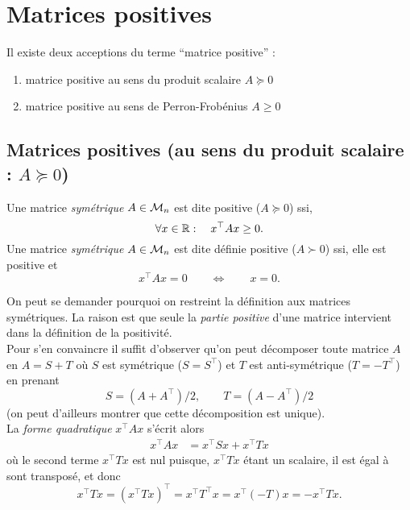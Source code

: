 \section{Matrices positives} \label{sec:LinAlg-Pos}

\remark Il existe deux acceptions du terme ``matrice positive'' :
\begin{enumerate}[$\bullet$]
  \item matrice positive au sens du produit scalaire $A \succcurlyeq 0$
  \item matrice positive au sens de Perron-Frobénius $A \geq 0$
\end{enumerate}


\subsection{Matrices positives (au sens du produit scalaire : $A \succcurlyeq 0$)} 

\begin{definition} \label{def:matricePositive}
  Une matrice {\em symétrique} $A \in \mathcal{M}_n$ est dite positive ($A \succcurlyeq 0$) ssi, 
  $$
  \forall x \in \mathbb{R}: \quad x^\top A x \geq 0.
  $$
  Une matrice {\em symétrique} $A \in \mathcal{M}_n$ est dite définie positive ($A \succ 0$) ssi, elle est positive et 
  $$
  x^\top A x = 0 \qquad \Leftrightarrow \qquad x = 0.
  $$
\end{definition}

\remark
On peut se demander pourquoi on restreint la définition aux matrices symétriques. La raison est que seule la {\em partie positive} d'une matrice intervient dans la définition de la positivité. \\
Pour s'en convaincre il suffit d'observer qu'on peut décomposer toute matrice $A$  en $A = S + T$ où $S$ est symétrique ($S = S^\top$) et $T$ est anti-symétrique ($T = -T^\top$) en prenant
$$
S = (A + A^\top) / 2, \qquad T = (A - A^\top) / 2
$$
(on peut d'ailleurs montrer que cette décomposition est unique). \\
La {\em forme quadratique} $x^\top A x$ s'écrit alors
\begin{align*}
  x^\top A x 
  & = x^\top S x + x^\top T x 
\end{align*}
où le second terme $x^\top T x$ est nul puisque, $x^\top T x$ étant un scalaire, il est égal à sont transposé, et donc
$$
x^\top T x = (x^\top T x)^\top = x^\top T^\top x = x^\top (- T) x = - x^\top T x.
$$


